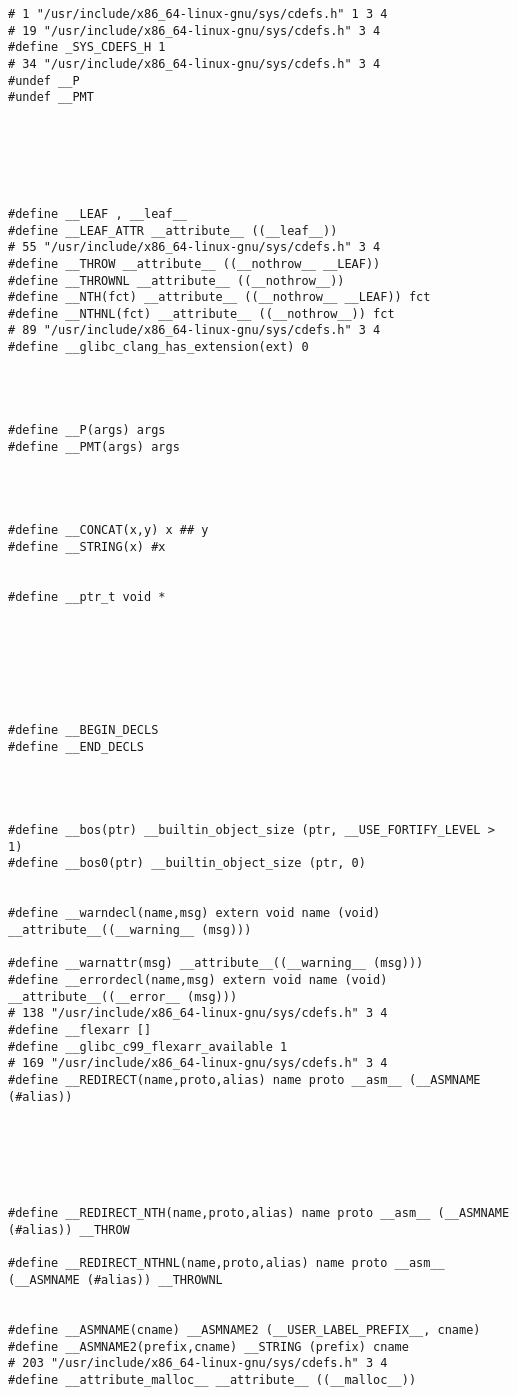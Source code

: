 \documentclass[11pt]{article}
\begin{document}
\begin{verbatim}
# 1 "/usr/include/x86_64-linux-gnu/sys/cdefs.h" 1 3 4
# 19 "/usr/include/x86_64-linux-gnu/sys/cdefs.h" 3 4
#define _SYS_CDEFS_H 1
# 34 "/usr/include/x86_64-linux-gnu/sys/cdefs.h" 3 4
#undef __P
#undef __PMT






#define __LEAF , __leaf__
#define __LEAF_ATTR __attribute__ ((__leaf__))
# 55 "/usr/include/x86_64-linux-gnu/sys/cdefs.h" 3 4
#define __THROW __attribute__ ((__nothrow__ __LEAF))
#define __THROWNL __attribute__ ((__nothrow__))
#define __NTH(fct) __attribute__ ((__nothrow__ __LEAF)) fct
#define __NTHNL(fct) __attribute__ ((__nothrow__)) fct
# 89 "/usr/include/x86_64-linux-gnu/sys/cdefs.h" 3 4
#define __glibc_clang_has_extension(ext) 0




#define __P(args) args
#define __PMT(args) args




#define __CONCAT(x,y) x ## y
#define __STRING(x) #x


#define __ptr_t void *







#define __BEGIN_DECLS 
#define __END_DECLS 




#define __bos(ptr) __builtin_object_size (ptr, __USE_FORTIFY_LEVEL > 1)
#define __bos0(ptr) __builtin_object_size (ptr, 0)


#define __warndecl(name,msg) extern void name (void) __attribute__((__warning__ (msg)))

#define __warnattr(msg) __attribute__((__warning__ (msg)))
#define __errordecl(name,msg) extern void name (void) __attribute__((__error__ (msg)))
# 138 "/usr/include/x86_64-linux-gnu/sys/cdefs.h" 3 4
#define __flexarr []
#define __glibc_c99_flexarr_available 1
# 169 "/usr/include/x86_64-linux-gnu/sys/cdefs.h" 3 4
#define __REDIRECT(name,proto,alias) name proto __asm__ (__ASMNAME (#alias))






#define __REDIRECT_NTH(name,proto,alias) name proto __asm__ (__ASMNAME (#alias)) __THROW

#define __REDIRECT_NTHNL(name,proto,alias) name proto __asm__ (__ASMNAME (#alias)) __THROWNL


#define __ASMNAME(cname) __ASMNAME2 (__USER_LABEL_PREFIX__, cname)
#define __ASMNAME2(prefix,cname) __STRING (prefix) cname
# 203 "/usr/include/x86_64-linux-gnu/sys/cdefs.h" 3 4
#define __attribute_malloc__ __attribute__ ((__malloc__))








\end{verbatim}
\end{document}
